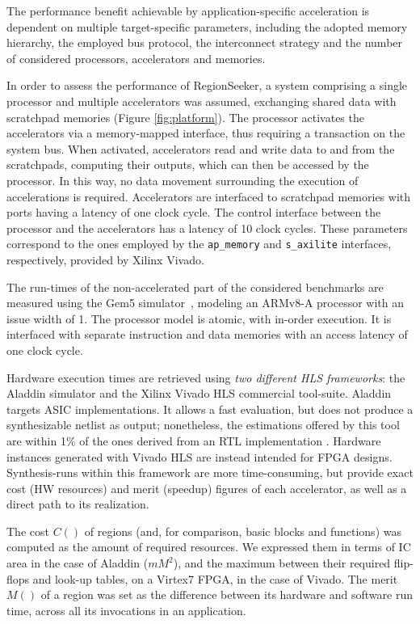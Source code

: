 \documentclass[]{usiinfthesis}
\newcommand{\rseeker}{{RegionSeeker}}
\begin{document}
The performance benefit achievable by application-specific
acceleration is dependent on multiple target-specific parameters,
including the adopted memory hierarchy, the employed bus protocol, the
interconnect strategy and the number of considered processors,
accelerators and memories.\par

In order to assess the performance of \rseeker, a system comprising
a single processor and multiple accelerators was assumed, exchanging shared data 
with scratchpad memories (Figure \ref{fig:platform}). 
The processor activates the accelerators via a memory-mapped
interface, thus requiring a transaction on the system bus. 
When activated, accelerators read and
write data to and from the scratchpads, computing their outputs, which
can then be accessed by the processor. In
this way, no data movement surrounding the execution of accelerations
is required. Accelerators are interfaced to scratchpad memories
with ports having a latency of one clock cycle. The
control interface between the processor and the accelerators has a
latency of 10 clock cycles.  These parameters correspond to the ones
employed by the \texttt{ap\_memory} and \texttt{s\_axilite}
interfaces, respectively, provided by Xilinx Vivado.\par

The run-times of the non-accelerated part of the considered
benchmarks are measured using the Gem5
simulator~\cite{BinkertFeb11}, modeling an ARMv8-A processor with an
issue width of 1. The processor model is atomic, with in-order
execution. It is interfaced with separate instruction and data
memories with an access latency of one clock cycle.\par

Hardware execution times are retrieved using \emph{two different HLS
  frameworks}: the Aladdin simulator and the Xilinx Vivado HLS
commercial tool-suite. Aladdin targets ASIC implementations. It
allows a fast evaluation, but does not produce a synthesizable netlist
as output; nonetheless, the estimations offered by this tool are
within 1\% of the ones derived from an RTL implementation
\cite{ShaoJul14}. Hardware instances generated with Vivado HLS are
instead intended for FPGA designs. Synthesis-runs within this
framework are more time-consuming, but provide exact cost (HW resources)
and merit (speedup) figures of each accelerator, as well as a direct
path to its realization.\par

The cost $C()$ of regions (and, for comparison, basic
blocks and functions) was computed as the amount of required resources. We
expressed them in terms of IC area in the case of Aladdin ($mM^2$), and the
maximum between their required flip-flops and look-up tables,
on a Virtex7 FPGA, in the case of Vivado. The merit $M()$ of a
region was set as the difference between its hardware and software run
time, across all its invocations in an application.
\end{document}
